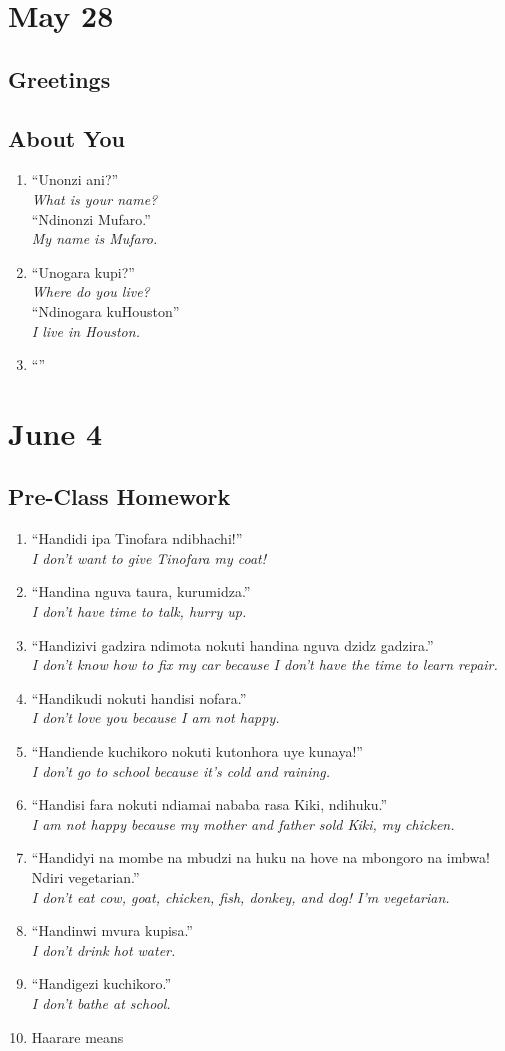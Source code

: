 \documentclass[12pt]{article}
\newcommand{\tl}[2]{``#1''\\\textit{#2}}
\begin{document}
\section{May 28}
\subsection{Greetings}
\subsection{About You}
\begin{enumerate}
\item \tl{Unonzi ani?}{What is your name?} \\ \tl{Ndinonzi Mufaro.}{My name is Mufaro.}
\item \tl{Unogara kupi?}{Where do you live?} \\ \tl{Ndinogara kuHouston}{I live in Houston.}
\item \tl{}{}
\end{enumerate}

\section{June 4}
\subsection{Pre-Class Homework}
\begin{enumerate}
\item \tl{Handidi ipa Tinofara ndibhachi!}{I don't want to give Tinofara my coat!}
\item \tl{Handina nguva taura, kurumidza.}{I don't have time to talk, hurry up.}
\item \tl{Handizivi gadzira ndimota nokuti handina nguva dzidz gadzira.}{I don't know how to fix my car because I don't have the time to learn repair.}
\item \tl{Handikudi nokuti handisi nofara.}{I don't love you because I am not happy.}
\item \tl{Handiende kuchikoro nokuti kutonhora uye kunaya!}{I don't go to school because it's cold and raining.}
\item \tl{Handisi fara nokuti ndiamai nababa rasa Kiki, ndihuku.}{I am not happy because my mother and father sold Kiki, my chicken.}
\item \tl{Handidyi na mombe na mbudzi na huku na hove na mbongoro na imbwa! Ndiri vegetarian.}{I don't eat cow, goat, chicken, fish, donkey, and dog! I'm vegetarian.}
\item \tl{Handinwi mvura kupisa.}{I don't drink hot water.}
\item \tl{Handigezi kuchikoro.}{I don't bathe at school.}
\item Haarare means
\end{enumerate}
\end{document}
